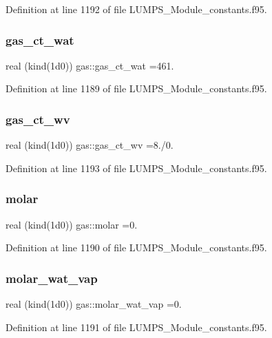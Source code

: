 Definition at line 1192 of file L\+U\+M\+P\+S\+\_\+\+Module\+\_\+constants.\+f95.

\mbox{\label{namespacegas_a5d7564fea612b3867805c157aff8acae}} 
\subsubsection{\texorpdfstring{gas\+\_\+ct\+\_\+wat}{gas\_ct\_wat}}
{\footnotesize\ttfamily real (kind(1d0)) gas\+::gas\+\_\+ct\+\_\+wat =461.}



Definition at line 1189 of file L\+U\+M\+P\+S\+\_\+\+Module\+\_\+constants.\+f95.

\mbox{\label{namespacegas_af2886584ed51b7aeb801840825049d91}} 
\subsubsection{\texorpdfstring{gas\+\_\+ct\+\_\+wv}{gas\_ct\_wv}}
{\footnotesize\ttfamily real (kind(1d0)) gas\+::gas\+\_\+ct\+\_\+wv =8./0.}



Definition at line 1193 of file L\+U\+M\+P\+S\+\_\+\+Module\+\_\+constants.\+f95.

\mbox{\label{namespacegas_a32b7a8a8aa0b674522c67d4cec42218f}} 
\subsubsection{\texorpdfstring{molar}{molar}}
{\footnotesize\ttfamily real (kind(1d0)) gas\+::molar =0.}



Definition at line 1190 of file L\+U\+M\+P\+S\+\_\+\+Module\+\_\+constants.\+f95.

\mbox{\label{namespacegas_ad10ab34d9d4d2e261f87f013d3822774}} 
\subsubsection{\texorpdfstring{molar\+\_\+wat\+\_\+vap}{molar\_wat\_vap}}
{\footnotesize\ttfamily real (kind(1d0)) gas\+::molar\+\_\+wat\+\_\+vap =0.}



Definition at line 1191 of file L\+U\+M\+P\+S\+\_\+\+Module\+\_\+constants.\+f95.

